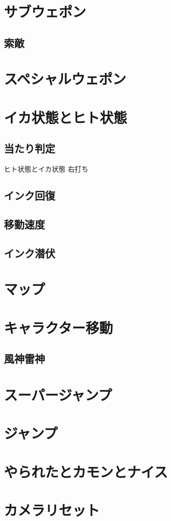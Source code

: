 \documentclass[a4paper,11pt]{jsbook}
\begin{document}
\chapter{サブウェポン}
\section{索敵}
\chapter{スペシャルウェポン}
\chapter{イカ状態とヒト状態}
\section{当たり判定}
ヒト状態とイカ状態
右打ち
\section{インク回復}
\section{移動速度}
\section{インク潜伏}
\chapter{マップ}
\chapter{キャラクター移動}
\section{風神雷神}
\chapter{スーパージャンプ}
\chapter{ジャンプ}
\chapter{やられたとカモンとナイス}
\chapter{カメラリセット}
\end{document}
